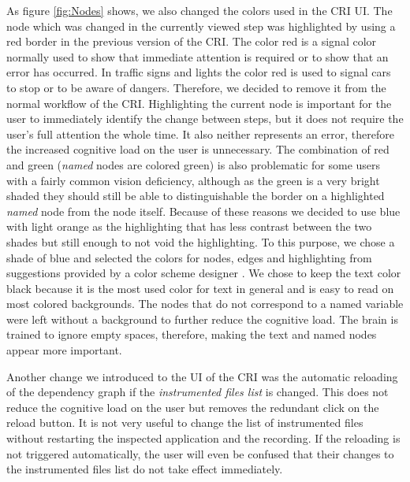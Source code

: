 As figure \ref{fig:Nodes} shows, we also changed the colors used in the CRI UI. The node which was changed in the currently viewed step was highlighted by using a red border in the previous version of the CRI. The color red is a signal color normally used to show that immediate attention is required or to show that an error has occurred. In traffic signs and lights the color red is used to signal cars to stop or to be aware of dangers. Therefore, we decided to remove it from the normal workflow of the CRI. Highlighting the current node is important for the user to immediately identify the change between steps, but it does not require the user's full attention the whole time. It also neither represents an error, therefore the increased cognitive load on the user is unnecessary. The combination of red and green (\emph{named} nodes are colored green) is also problematic for some users with a fairly common vision deficiency, although as the green is a very bright shaded they should still be able to distinguishable the border on a highlighted \emph{named} node from the node itself. Because of these reasons we decided to use blue with light orange as the highlighting that has less contrast between the two shades but still enough to not void the highlighting. To this purpose, we chose a shade of blue and selected the colors for nodes, edges and highlighting from suggestions provided by a color scheme designer \cite{Paletton}. We chose to keep the text color black because it is the most used color for text in general and is easy to read on most colored backgrounds. The nodes that do not correspond to a named variable were left without a background to further reduce the cognitive load. The brain is trained to ignore empty spaces, therefore, making the text and named nodes appear more important.

Another change we introduced to the UI of the CRI was the automatic reloading of the dependency graph if the \emph{instrumented files list} is changed. This does not reduce the cognitive load on the user but removes the redundant click on the reload button. It is not very useful to change the list of instrumented files without restarting the inspected application and the recording. If the reloading is not triggered automatically, the user will even be confused that their changes to the instrumented files list do not take effect immediately.
	
